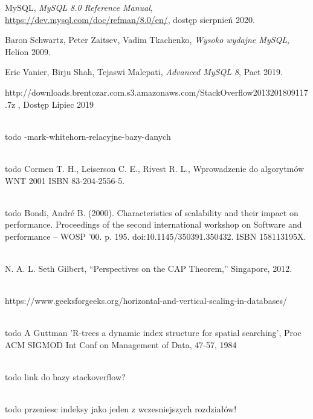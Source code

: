 \begin{thebibliography}{}
	
	 MySQL, \emph{MySQL 8.0 Reference Manual}, \url{https://dev.mysql.com/doc/refman/8.0/en/}, dostęp sierpnień 2020.
	
	 Baron Schwartz, Peter Zaitsev, Vadim Tkachenko,  \emph{Wysoko wydajne MySQL}, Helion 2009.
	
	 Eric Vanier, Birju Shah, Tejaswi Malepati,  \emph{Advanced MySQL 8}, Pact 2019.
	
	 http://downloads.brentozar.com.s3.amazonaws.com/\newline StackOverflow2013\textunderscore 201809117.7z , Dostęp Lipiec 2019
		
	\\todo -mark-whitehorn-relacyjne-bazy-danych
	
	\\todo Cormen T. H., Leiserson C. E., Rivest R. L., Wprowadzenie do algorytmów WNT 2001 ​ISBN 83-204-2556-5​.	
	
	\\todo Bondi, André B. (2000). Characteristics of scalability and their impact on performance. Proceedings of the second international workshop on Software and performance – WOSP '00. p. 195. doi:10.1145/350391.350432. ISBN 158113195X.
	
	\\N. A. L. Seth Gilbert, “Perspectives on the CAP
	Theorem,” Singapore, 2012.
	
	\\https://www.geeksforgeeks.org/horizontal-and-vertical-scaling-in-databases/
	
	\\todo A Guttman 'R-trees a dynamic index structure for spatial searching', Proc ACM SIGMOD Int Conf on Management of Data, 47-57, 1984 
		
	\\todo link do bazy stackoverflow?
	
	
	
	\\todo przeniesc indeksy jako jeden z wczesniejszych rozdziałów!
\end{thebibliography}